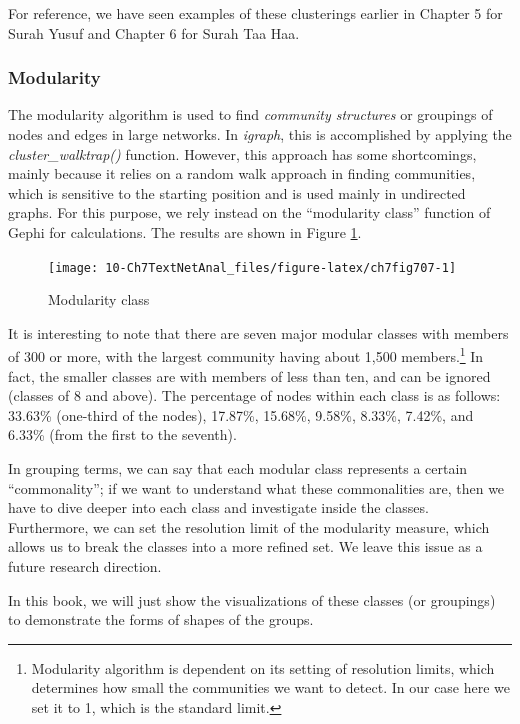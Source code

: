 \documentclass[
]{article}
\begin{document}
For reference, we have seen examples of these clusterings earlier in Chapter 5 for Surah Yusuf and Chapter 6 for Surah Taa Haa.

\hypertarget{modularity}{%
\subsubsection{Modularity}\label{modularity}}

The modularity algorithm is used to find \emph{community structures} or groupings of nodes and edges in large networks. In \emph{igraph}, this is accomplished by applying the \emph{cluster\_walktrap()} function. However, this approach has some shortcomings, mainly because it relies on a random walk approach in finding communities, which is sensitive to the starting position and is used mainly in undirected graphs. For this purpose, we rely instead on the ``modularity class'' function of Gephi for calculations. The results are shown in Figure \ref{fig:ch7fig707}.

\begin{figure}

{\centering \texttt{[image: 10-Ch7TextNetAnal\_files/figure-latex/ch7fig707-1]} 

}

\caption{Modularity class}\label{fig:ch7fig707}
\end{figure}

It is interesting to note that there are seven major modular classes with members of 300 or more, with the largest community having about 1,500 members.\footnote{Modularity algorithm is dependent on its setting of resolution limits, which determines how small the communities we want to detect. In our case here we set it to 1, which is the standard limit.} In fact, the smaller classes are with members of less than ten, and can be ignored (classes of 8 and above). The percentage of nodes within each class is as follows: 33.63\% (one-third of the nodes), 17.87\%, 15.68\%, 9.58\%, 8.33\%, 7.42\%, and 6.33\% (from the first to the seventh).

In grouping terms, we can say that each modular class represents a certain ``commonality''; if we want to understand what these commonalities are, then we have to dive deeper into each class and investigate inside the classes. Furthermore, we can set the resolution limit of the modularity measure, which allows us to break the classes into a more refined set. We leave this issue as a future research direction.

In this book, we will just show the visualizations of these classes (or groupings) to demonstrate the forms of shapes of the groups.
\end{document}
